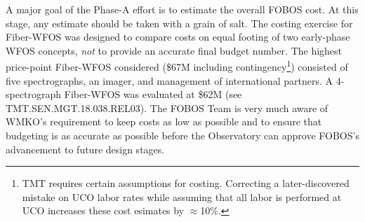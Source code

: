 
A major goal of the Phase-A effort is to estimate the overall FOBOS
cost. At this stage, any estimate should be taken with a grain of
salt. The costing exercise for Fiber-WFOS was designed to compare
costs on equal footing of two early-phase WFOS concepts, {\it not} to
provide an accurate final budget number. The highest price-point
Fiber-WFOS considered (\$67M including contingency\footnote{TMT
requires certain assumptions for costing. Correcting a
later-discovered mistake on UCO labor rates while assuming that all
labor is performed at UCO increases these cost esimates by
$\approx$10\%.}) consisted of five spectrographs, an imager, and
management of international partners. A 4-spectrograph Fiber-WFOS was
evaluated at \$62M (see TMT.SEN.MGT.18.038.REL03). The FOBOS Team is
very much aware of WMKO's requirement to keep costs as low as
possible and to ensure that budgeting is as accurate as possible
before the Observatory can approve FOBOS's advancement to future
design stages.





